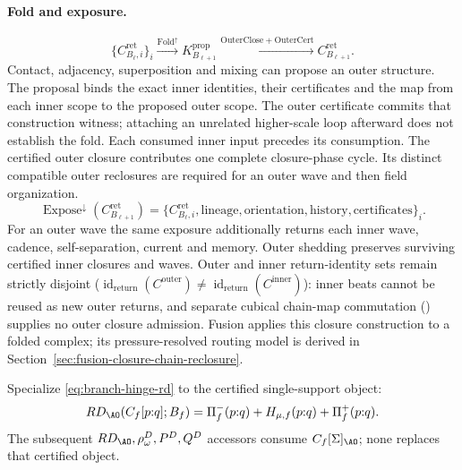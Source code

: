 \paragraph{Fold and exposure.}
\begin{equation}
\{C^{\mathrm{ret}}_{B_\ell,i}\}_i
\xrightarrow{\operatorname{Fold}^{\uparrow}}K^{\mathrm{prop}}_{B_{\ell+1}}
\xrightarrow{\mathrm{OuterClose}+\mathrm{OuterCert}}C^{\mathrm{ret}}_{B_{\ell+1}}.
\label{eq:fold-outer-closure}
\end{equation}
Contact, adjacency, superposition and mixing can propose an outer structure.
The proposal binds the exact inner identities, their certificates and the map
from each inner scope to the proposed outer scope. The outer certificate commits
that construction witness; attaching an unrelated higher-scale loop afterward
does not establish the fold. Each consumed inner input precedes its consumption.
The certified outer closure contributes one complete closure-phase cycle. Its distinct compatible
outer reclosures are required for an outer wave and then field organization.
\begin{equation}
\operatorname{Expose}^{\downarrow}(C^{\mathrm{ret}}_{B_{\ell+1}})
=\{C^{\mathrm{ret}}_{B_\ell,i},\mathrm{lineage},\mathrm{orientation},
\mathrm{history},\mathrm{certificates}\}_i.
\label{eq:expose-inner-lineage}
\end{equation}
For an outer wave the same exposure additionally returns each inner wave,
cadence, self-separation, current and memory. Outer shedding preserves
surviving certified inner closures and waves. Outer and inner return-identity sets
remain strictly disjoint (\(\operatorname{id}_{\mathrm{return}}(C^{\mathrm{outer}})\ne\operatorname{id}_{\mathrm{return}}(C^{\mathrm{inner}})\)):
inner beats cannot be reused as new outer returns, and separate cubical
chain-map commutation () supplies no outer closure
admission. Fusion applies this closure construction to a folded
complex; its pressure-resolved routing model is derived in Section~\ref{sec:fusion-closure-chain-reclosure}.

Specialize \eqref{eq:branch-hinge-rd} to the certified single-support object:
\begin{equation}
RD_{\AO}\!\left(C_f[p{:}q];B_f\right)
=
\Pi^-_f(p{:}q)+H_{\mu,f}(p{:}q)+\Pi^+_f(p{:}q).
\label{eq:cycle-rd-accessor}
\end{equation}
The subsequent \(RD_{\AO},\rho^D_\omega,P^D,Q^D\) accessors consume
\(C_f[\Sigma]_{\AO}\); none replaces that certified object.

